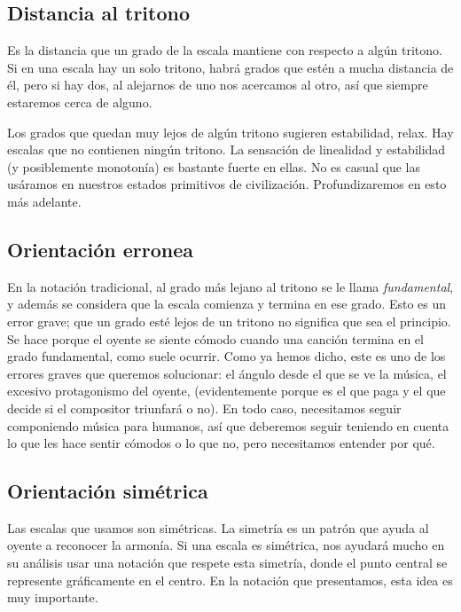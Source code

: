\documentclass[]{report}
\begin{document}
\subsection{Distancia al tritono}

Es la distancia que un grado de la escala mantiene con respecto a algún tritono. Si en una escala hay un solo tritono, habrá grados que estén a mucha distancia de él, pero si hay dos, al alejarnos de uno nos acercamos al otro, así que siempre estaremos cerca de alguno.

Los grados que quedan muy lejos de algún tritono sugieren estabilidad, relax. Hay escalas que no contienen ningún tritono. La sensación de linealidad y estabilidad (y posiblemente monotonía) es bastante fuerte en ellas. No es casual que las usáramos en nuestros estados primitivos de civilización. Profundizaremos en esto más adelante.

\subsection{Orientación erronea}

En la notación tradicional, al grado más lejano al tritono se le llama \emph{fundamental}, y además se considera que la escala comienza y termina en ese grado. Esto es un error grave; que un grado esté lejos de un tritono no significa que sea el principio. Se hace porque el oyente se siente cómodo cuando una canción termina en el grado fundamental, como suele ocurrir. Como ya hemos dicho, este es uno de los errores graves que queremos solucionar: el ángulo desde el que se ve la música, el excesivo protagonismo del oyente, (evidentemente porque es el que paga y el que decide si el compositor triunfará o no). En todo caso, necesitamos seguir componiendo música para humanos, así que deberemos seguir teniendo en cuenta lo que les hace sentir cómodos o lo que no, pero necesitamos entender por qué.

\subsection{Orientación simétrica}

Las escalas que usamos son simétricas. La simetría es un patrón que ayuda al oyente a reconocer la armonía. Si una escala es simétrica, nos ayudará mucho en su análisis usar una notación que respete esta simetría, donde el punto central se represente gráficamente en el centro. En la notación que presentamos, esta idea es muy importante.
\end{document}

